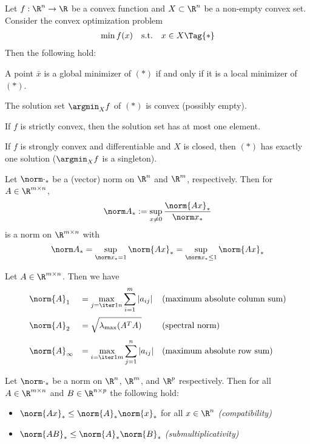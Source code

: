 \label{f546fc9}

Let $f:\R^n\to\R$ be a convex function and $X\subset\R^n$ be a non-empty convex
set. Consider the convex optimization problem
\begin{equation*}
  \begin{array}{l l l}
    \min f(x) & \text{s.t.} & x\in X\Tag{*}
  \end{array}
\end{equation*}
Then the following hold:
\begin{enumerata}
  \item A point $\bar x$ is a global minimizer of $(*)$ if and only if it is a local
  minimizer of $(*)$.
  \item The solution set $\argmin_Xf$ of $(*)$ is convex (possibly empty).
  \item If $f$ is strictly convex, then the solution set has at most one element.
  \item If $f$ is strongly convex and differentiable and $X$ is closed, then $(*)$ has
  exactly one solution ($\argmin_Xf$ is a singleton).
\end{enumerata}

\label{bad47a4}

Let $\norm\cdot_*$ be a (vector) norm on $\R^n$ and $\R^m$, respectively. Then
for $A\in\R^{m\times n}$,
$$
  \norm A_*:=\sup_{x\neq0}\frac{\norm{Ax}_*}{\norm x_*}
$$
is a norm on $\R^{m\times n}$ with
$$
  \norm A_*=\sup_{\norm x_*=1}\norm{Ax}_*=\sup_{\norm x_*\leq1}\norm{Ax}_*
$$

\label{ab2107f}

Let $A\in\R^{m\times n}$. Then we have
$$
  \begin{array}{l l l}
    \norm{A}_1      & = \displaystyle\max_{j=\iter1n}\sum_{i=1}^m|a_{ij}| & \text{(maximum absolute column sum)} \\[1.5em]
    \norm{A}_2      & = \displaystyle\sqrt{\lambda_{\max}(A^TA)}          & \text{(spectral norm)}               \\[1em]
    \norm{A}_\infty & = \displaystyle\max_{i=\iter1m}\sum_{j=1}^n|a_{ij}| & \text{(maximum absolute row sum)}
  \end{array}
$$

\label{dd47a09}

Let $\norm\cdot_*$ be a norm on $\R^n$, $\R^m$, and $\R^p$ respectively. Then
for all $A\in\R^{m\times n}$ and $B\in\R^{n\times p}$ the following hold:
\begin{itemize}
  \def\nm#1{\norm{#1}_*}
  \item $\nm{Ax}\leq\nm A\nm x$ for all $x\in\R^n$ \quad \textit{(compatibility)}
  \item $\nm{AB}\leq\nm A\nm B$ \quad \textit{(submultiplicativity)}
\end{itemize}

